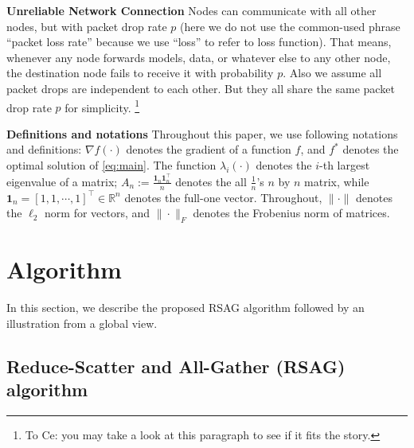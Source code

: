 \documentclass{article}
\renewcommand{\paragraph}[1]{\noindent\textbf{#1}}
\def\rc{\color{red}}
\newcounter{ass_counter}
\newcounter{thm_counter}
\begin{document}
\paragraph{Unreliable Network Connection} Nodes can communicate with all other nodes, but with packet drop rate $p$ (here we do not use the common-used phrase {\rc ``packet loss rate''} because we use {\rc``loss''} to refer to loss function). That means, whenever any node {\rc forwards models, data, or whatever else to any other node}, the destination node {\rc fails to} receive it with probability $p$. Also we assume {\rc all packet drops are independent to each other}. But they all share the same packet drop rate $p$ {\rc for simplicity}.
\footnote{\rc To Ce: you may take a look at this paragraph to see if it fits the story.}

\paragraph{Definitions and notations}
Throughout this paper, we use following notations and definitions: $\nabla f(\cdot)$ denotes the gradient of a function $f$, and $f^{*}$ denotes the optimal solution of \eqref{eq:main}.
The function $\lambda_{i}(\cdot)$ denotes the $i$-th largest eigenvalue of a matrix;  {\rc $A_n:=\frac{\bm{1}_n\bm{1}_n^{\top}}{n}$ denotes the all $\frac{1}{n}$'s $n$ by $n$ matrix}, while $\bm{1}_n=[1,1,\cdots,1]^{\top}\in\mathbb{R}^n$ denotes the full-one vector. Throughout, $\|\cdot\|$ denotes the {\rc $\ell_2$ norm for vectors,} and $\|\cdot\|_F$ denotes the Frobenius norm of {\rc matrices}.

\section{Algorithm}

In this section, we describe {\rc the proposed RSAG algorithm followed by an illustration from a global view}. 

\subsection{Reduce-Scatter and All-Gather (RSAG) algorithm}
\end{document}
